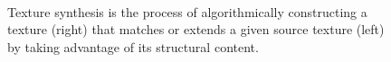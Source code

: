\begin{figure}[t]
\begin{center}
	\\
	\caption[Texture synthesis]{Texture synthesis is the process of algorithmically constructing a texture (right) that matches or extends a given source texture (left) by taking advantage of its structural content.}
	\vspace{-0.65cm}
	\label{fig:texture_synthesis}
\end{center}
\end{figure}